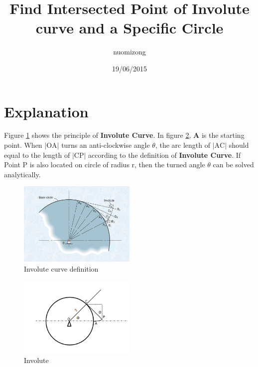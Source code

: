 \documentclass[10pt,a4paper]{article}
\begin{document}
	
	
	\author{nuomizong}
	\title{Find Intersected Point of Involute curve and a Specific Circle}
	\date{19/06/2015}
	\maketitle
	
	\newpage
	
	\section{Explanation}
	Figure \ref{fig: involute curve definition} shows the principle of \textbf{Involute Curve}. In figure \ref{fig: involute curve}, \textbf{A} is the starting point. When $ |\mathrm{OA}| $ turns an anti-clockwise angle $ \theta $, the arc length of $ |\mathrm{AC}| $ should equal to the length of $ |\mathrm{CP}| $ according to the definition of \textbf{Involute Curve}. If Point P is also located on circle of radius r, then the turned angle $ \theta $ can be solved analytically.
	
	\begin{figure}[h]
		\centering
		\includegraphics[width = 0.5\textwidth]{involute_curve_definition}
		\caption{Involute curve definition} \label{fig: involute curve definition}
		\vspace{\baselineskip}
	\end{figure}
	
	\begin{figure}[h]
		\centering
		\includegraphics[width = 0.5\textwidth]{involute_curve}
		\caption{Involute } \label{fig: involute curve}
		\vspace{\baselineskip}
	\end{figure}
	
\end{document}
